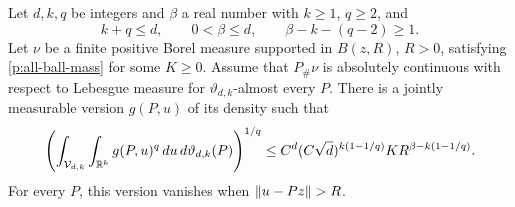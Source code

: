 \begin{theorem}
\label{p:frame-moment}
Let \(d,k,q\) be integers and \(\beta\) a real number with
\(k\ge1\), \(q\ge2\), and
\begin{equation}\label{p:frame-margins}
 k+q\le d,\qquad 0<\beta\le d,\qquad
 \beta-k-(q-2)\ge1.
\end{equation}
Let \(\nu\) be a finite positive Borel measure supported in
\(B(z,R)\), \(R>0\), satisfying \eqref{p:all-ball-mass} for some
\(K\ge0\). Assume that \(P_\#\nu\) is absolutely continuous with
respect to Lebesgue measure for \(\vartheta_{d,k}\)-almost every \(P\).
There is a jointly measurable version \(g(P,u)\) of its density such that
\begin{equation}\label{p:frame-moment-bound}
 \left(\int_{\mathcal V_{d,k}}\int_{\mathbb R^k}g(P,u)^q\,du\,
 d\vartheta_{d,k}(P)\right)^{1/q}
 \le C^d(C\sqrt d)^{k(1-1/q)}
 K R^{\beta-k(1-1/q)}.
\end{equation}
For every \(P\), this version vanishes when \(\left\lVert u-Pz\right\rVert>R\).
\end{theorem}


